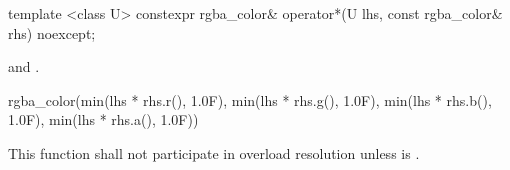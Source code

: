 %
\begin{itemdecl}
template <class U>
constexpr rgba_color& operator*(U lhs, const rgba_color& rhs) noexcept;
\end{itemdecl}
\begin{itemdescr}
\pnum
\requires
{} and .

\pnum
\returns
\begin{codeblock}
rgba_color(min(lhs * rhs.r(), 1.0F), min(lhs * rhs.g(), 1.0F),
  min(lhs * rhs.b(), 1.0F), min(lhs * rhs.a(), 1.0F))
\end{codeblock}

\pnum
\remarks
This function shall not participate in overload resolution unless  is .
\end{itemdescr}
